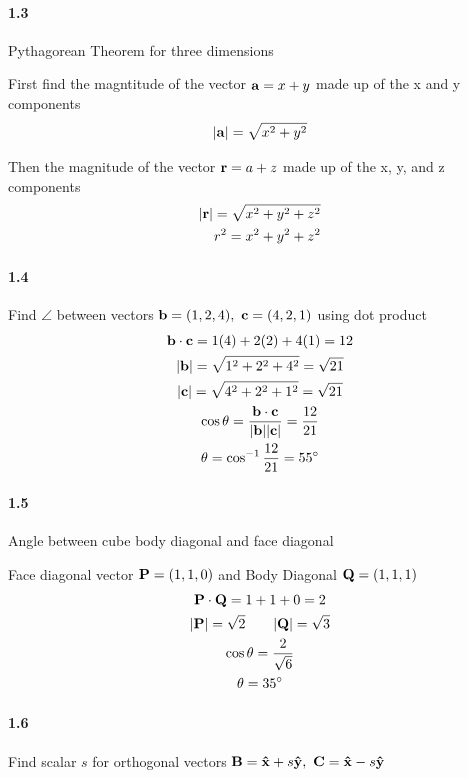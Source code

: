 \documentclass[../problems.tex]{subfiles}
\begin{document}
\paragraph{1.3}
Pythagorean Theorem for three dimensions
\barh

First find the magntitude of the vector $\mathbf{a} = x + y$ made up of the x and y components 
\begin{equation*}
    |\mathbf{a}| = \sqrt{x^2 + y^2}
\end{equation*}

Then the magnitude of the vector $\mathbf{r} = a + z$ made up of the x, y, and z components
\begin{align*}
    |\mathbf{r}| = \sqrt{x^2 + y^2 + z^2} \\
    r^2 = x^2 + y^2 + z^2
\end{align*}

\paragraph{1.4}
Find $\angle$ between vectors $\mathbf{b}= (1,2,4) ,\  \mathbf{c} = (4,2,1)$ using dot product
\barh
\begin{gather*}
    \mathbf{b}\cdot \mathbf{c} = 1(4) + 2(2) + 4(1) = 12 \\
    |\mathbf{b}| = \sqrt{1^2 + 2^2 + 4^2} = \sqrt{21} \\
    |\mathbf{c}| = \sqrt{4^2 + 2^2 + 1^2} = \sqrt{21} \\
    \cos \theta = \frac{\mathbf{b}\cdot \mathbf{c}}{|\mathbf{b}||\mathbf{c}|} = \frac{12}{21} \\
    \theta = \cos^{-1} \frac{12}{21} = 55^\circ
\end{gather*}

\paragraph{1.5}
Angle between cube body diagonal and face diagonal
\barh

Face diagonal vector $\mathbf{P} = (1,1,0)$ and Body Diagonal $\mathbf{Q} = (1,1,1)$
\begin{gather*}
    \mathbf{P} \cdot \mathbf{Q} = 1 + 1 + 0 = 2 \\
    |\mathbf{P}| = \sqrt{2} \qquad |\mathbf{Q}| = \sqrt{3} \\
    \cos \theta = \frac{2}{\sqrt{6}} \\
    \theta = 35^\circ
\end{gather*}

\paragraph{1.6}
Find scalar $s$ for orthogonal vectors $\mathbf{B} =  \mathbf{\hat x} + s \mathbf{\hat y} , \  \mathbf{C} 
= \mathbf{\hat x} - s\mathbf{\hat y}$
\barh
\end{document}
